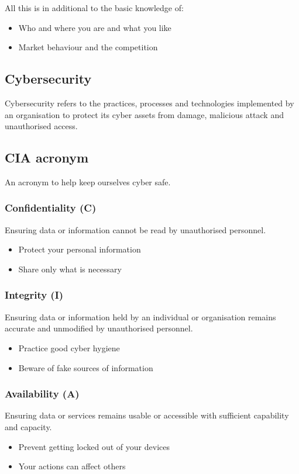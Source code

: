 \documentclass[11pt]{article}
\begin{document}
All this is in additional to the basic knowledge of:
\begin{itemize}
\item Who and where you are and what you like
\item Market behaviour and the competition
\end{itemize}

\subsection{Cybersecurity}
\label{sec:org00717c7}
Cybersecurity refers to the practices, processes and technologies implemented by an organisation to protect its cyber assets from damage, malicious attack and unauthorised access.

\subsection{CIA acronym}
\label{sec:org8e9b717}
An acronym to help keep ourselves cyber safe.

\subsubsection{Confidentiality (C)}
\label{sec:orgf211532}
Ensuring data or information cannot be read by unauthorised personnel.
\begin{itemize}
\item Protect your personal information
\item Share only what is necessary
\end{itemize}

\subsubsection{Integrity (I)}
\label{sec:org807e1a0}
Ensuring data or information held by an individual or organisation remains accurate and unmodified by unauthorised personnel.
\begin{itemize}
\item Practice good cyber hygiene
\item Beware of fake sources of information
\end{itemize}

\subsubsection{Availability (A)}
\label{sec:org3b183e6}
Ensuring data or services remains usable or accessible with sufficient capability and capacity.
\begin{itemize}
\item Prevent getting locked out of your devices
\item Your actions can affect others
\end{itemize}
\end{document}
